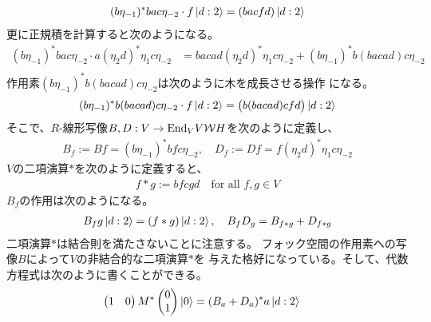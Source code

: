 {\begin{equation*}
\begin{split}
		(b\eta_{-1})^*bac\eta_{-2}\cdot f\mathinner{|{d:2}\rangle} = (bacfd)\mathinner{|{d:2}\rangle}
	\end{split}\end{equation*}
	更に正規積を計算すると次のようになる。
	\begin{equation*}\begin{split}
		(b\eta_{-1})^*bac\eta_{-2} \cdot a(\eta_2d)^*\eta_1c\eta_{-2}
		&= bacad(\eta_2d)^*\eta_1c\eta_{-2} 
			+ (b\eta_{-1})^*b(bacad)c\eta_{-2} \\
	\end{split}\end{equation*}
	作用素$(b\eta_{-1})^*b(bacad)c\eta_{-2}$は次のように木を成長させる操作
	になる。
	\begin{equation*}\begin{split}
		(b\eta_{-1})^*b(bacad)c\eta_{-2}\cdot f\mathinner{|{d:2}\rangle}
		= \bigl(b(bacad)cfd\bigr)\mathinner{|{d:2}\rangle}
	\end{split}\end{equation*}
	そこで、$R$-線形写像$B,D:V\to {\ensuremath{\operatorname{End}}}_VV{{\mathcal{W}}} H$を次のように定義し、
	\begin{equation}\label{eq:BとDの定義}\begin{split}
		B_f := Bf = (b\eta_{-1})^*bfc\eta_{-2}
		,\quad D_f := Df = f(\eta_2d)^*\eta_1c\eta_{-2}
	\end{split}\end{equation}
	$V$の二項演算$*$を次のように定義すると、
	\begin{equation*}\begin{split}
		f*g := bfcgd \quad\text{for all } f,g\in V
	\end{split}\end{equation*}
	$B_f$の作用は次のようになる。
	\begin{equation*}\begin{split}
		B_fg\mathinner{|{d:2}\rangle} = (f*g)\mathinner{|{d:2}\rangle},\quad B_fD_g = B_{f*g} + D_{f*g}
	\end{split}\end{equation*}
	二項演算$*$は結合則を満たさないことに注意する。
	フォック空間の作用素への写像$B$によって$V$の非結合的な二項演算$*$を
	与えた格好になっている。そして、代数方程式は次のように書くことができる。
	\begin{equation*}\begin{split}
		\begin{pmatrix}
			1 & 0
		\end{pmatrix}M^*\begin{pmatrix}
			0 \\ 1
		\end{pmatrix}\ket{0} &= (B_a + D_a)^*a\ket{d:2}

\end{split}
\end{equation*}}

